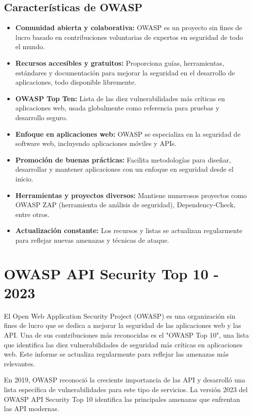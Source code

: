 \documentclass[a4paper,12pt]{article}
\begin{document}
\subsection*{Características de OWASP}
\begin{itemize}
    \item \textbf{Comunidad abierta y colaborativa:} OWASP es un proyecto sin fines de lucro basado en contribuciones voluntarias de expertos en seguridad de todo el mundo.
    \item \textbf{Recursos accesibles y gratuitos:} Proporciona guías, herramientas, estándares y documentación para mejorar la seguridad en el desarrollo de aplicaciones, todo disponible libremente.
    \item \textbf{OWASP Top Ten:} Lista de las diez vulnerabilidades más críticas en aplicaciones web, usada globalmente como referencia para pruebas y desarrollo seguro.
    \item \textbf{Enfoque en aplicaciones web:} OWASP se especializa en la seguridad de software web, incluyendo aplicaciones móviles y APIs.
    \item \textbf{Promoción de buenas prácticas:} Facilita metodologías para diseñar, desarrollar y mantener aplicaciones con un enfoque en seguridad desde el inicio.
    \item \textbf{Herramientas y proyectos diversos:} Mantiene numerosos proyectos como OWASP ZAP (herramienta de análisis de seguridad), Dependency-Check, entre otros.
    \item \textbf{Actualización constante:} Los recursos y listas se actualizan regularmente para reflejar nuevas amenazas y técnicas de ataque.
\end{itemize}

\section{OWASP API Security Top 10 - 2023}

El Open Web Application Security Project (OWASP) es una organización sin fines de lucro que se dedica a mejorar la seguridad de las aplicaciones web y las API. Una de sus contribuciones más reconocidas es el "OWASP Top 10", una lista que identifica las diez vulnerabilidades de seguridad más críticas en aplicaciones web. Este informe se actualiza regularmente para reflejar las amenazas más relevantes.

En 2019, OWASP reconoció la creciente importancia de las API y desarrolló una lista específica de vulnerabilidades para este tipo de servicios. La versión 2023 del OWASP API Security Top 10 identifica las principales amenazas que enfrentan las API modernas.
\end{document}
